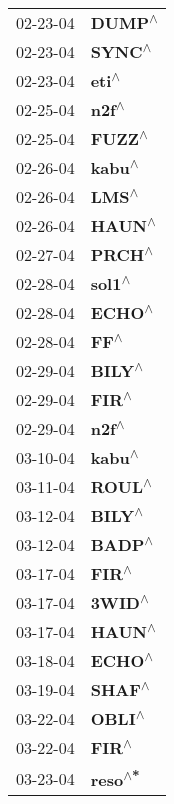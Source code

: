 \begin{supertabular}{p{0.08\textwidth}p{0.2\textwidth}}
 02-23-04 &    \textbf{DUMP\textsuperscript{$\wedge$}} \\
 02-23-04 &    \textbf{SYNC\textsuperscript{$\wedge$}} \\
 02-23-04 &     \textbf{eti\textsuperscript{$\wedge$}} \\
 02-25-04 &     \textbf{n2f\textsuperscript{$\wedge$}} \\
 02-25-04 &    \textbf{FUZZ\textsuperscript{$\wedge$}} \\
 02-26-04 &    \textbf{kabu\textsuperscript{$\wedge$}} \\
 02-26-04 &     \textbf{LMS\textsuperscript{$\wedge$}} \\
 02-26-04 &    \textbf{HAUN\textsuperscript{$\wedge$}} \\
 02-27-04 &    \textbf{PRCH\textsuperscript{$\wedge$}} \\
 02-28-04 &    \textbf{sol1\textsuperscript{$\wedge$}} \\
 02-28-04 &    \textbf{ECHO\textsuperscript{$\wedge$}} \\
 02-28-04 &      \textbf{FF\textsuperscript{$\wedge$}} \\
 02-29-04 &    \textbf{BILY\textsuperscript{$\wedge$}} \\
 02-29-04 &     \textbf{FIR\textsuperscript{$\wedge$}} \\
 02-29-04 &     \textbf{n2f\textsuperscript{$\wedge$}} \\
 03-10-04 &    \textbf{kabu\textsuperscript{$\wedge$}} \\
 03-11-04 &    \textbf{ROUL\textsuperscript{$\wedge$}} \\
 03-12-04 &    \textbf{BILY\textsuperscript{$\wedge$}} \\
 03-12-04 &    \textbf{BADP\textsuperscript{$\wedge$}} \\
 03-17-04 &     \textbf{FIR\textsuperscript{$\wedge$}} \\
 03-17-04 &    \textbf{3WID\textsuperscript{$\wedge$}} \\
 03-17-04 &    \textbf{HAUN\textsuperscript{$\wedge$}} \\
 03-18-04 &    \textbf{ECHO\textsuperscript{$\wedge$}} \\
 03-19-04 &    \textbf{SHAF\textsuperscript{$\wedge$}} \\
 03-22-04 &    \textbf{OBLI\textsuperscript{$\wedge$}} \\
 03-22-04 &     \textbf{FIR\textsuperscript{$\wedge$}} \\
 03-23-04 &   \textbf{reso\textsuperscript{$\wedge$*}} \\

\end{supertabular}
